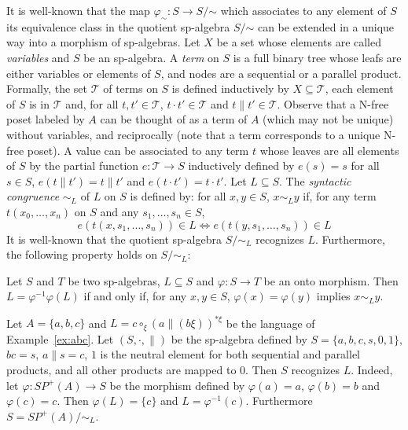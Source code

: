 \documentclass{CSML}
\begin{document}
It is well-known that the map $\varphi_\sim:S\to S/\mathord{\sim}$ which associates to any element of $S$ its equivalence class in the quotient sp-algebra $S/\mathord{\sim}$ can be extended in a unique way into a morphism of sp-algebras.
Let $X$ be a set whose elements are called \emph{variables} and $S$ be an sp-algebra. 
A \emph{term} on $S$ is a full binary tree whose leafs are either variables or elements of $S$, and nodes are a sequential or a parallel product.
Formally, the set ${\mathcal T}$ of terms on $S$ is defined inductively by $X\subseteq {\mathcal T}$, each element of $S$ is in ${\mathcal T}$ and, for all $t,t'\in {\mathcal T}$, $t\cdot t'\in {\mathcal T}$ and $t\parallel t'\in {\mathcal T}$. 
Observe that a N-free poset labeled by $A$ can be thought of as a term of $A$ (which may not be unique) without variables, and reciprocally (note that a term corresponds to a unique N-free poset).
A value can be associated to any term $t$ whose leaves are all elements of $S$ by the partial function $e:{\mathcal T}\to S$ inductively defined by $e(s)=s$ for all $s\in S$, $e(t\parallel t')=t\parallel t'$ and $e(t\cdot t')=t\cdot t'$.
Let $L\subseteq S$. The \emph{syntactic congruence} $\sim_L$ of $L$ on $S$ is defined by: for all $x,y\in S$, $x\sim_L y$ if, for any term $t(x_0,\dots,x_n)$ on $S$ and any $s_1,\dots,s_n\in S$, $$e(t(x,s_1,\dots,s_n))\in L\iff e(t(y,s_1,\dots,s_n))\in L$$
It is well-known that the quotient sp-algebra $S/\mathord{\sim_L}$ recognizes $L$. Furthermore, the following property holds on $S/\mathord{\sim_L}$:
\begin{prop}
  \label{prop:synt}
  Let $S$ and $T$ be two sp-algebras, $L\subseteq S$ and $\varphi:S\to T$ be an onto morphism.
  Then $L=\varphi^{-1}\varphi(L)$ if and only if, for any $x,y\in S$, $\varphi(x)=\varphi(y)$ implies $x\sim_L y$.
\end{prop}

\begin{exa}
  \label{ex:abcAlgebra}
  Let $A=\{a,b,c\}$ and $L=c\circ_\xi(a\parallel(b\xi))^{*\xi}$ be the language of Example~\ref{ex:abc}.
  Let $(S,\cdot,\parallel)$ be the sp-algebra defined by $S=\{a,b,c,s,0,1\}$, $bc=s$, $a\parallel s=c$, $1$ is the neutral element for both sequential and parallel products, and all other products are mapped to $0$. 
  Then $S$ recognizes $L$.
  Indeed, let $\varphi: SP^+(A)\to S$ be the morphism defined by $\varphi(a)=a$, $\varphi(b)=b$ and $\varphi(c)=c$.
  Then $\varphi(L)=\{c\}$ and $L=\varphi^{-1}(c)$.
  Furthermore $S=SP^+(A)/\mathord{\sim_L}$.
\end{exa}
\end{document}
